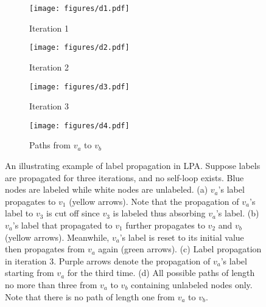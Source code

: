 \documentclass{article}
\begin{document}
		\begin{figure}[t]
		\centering
        \begin{subfigure}[b]{0.2\textwidth}
            \texttt{[image: figures/d1.pdf]}
            \caption{Iteration 1}
            \label{fig:d1}
        \end{subfigure}
        \hfill
        \begin{subfigure}[b]{0.2\textwidth}
            \texttt{[image: figures/d2.pdf]}
            \caption{Iteration 2}
            \label{fig:d2}
        \end{subfigure}
        \hfill
        \begin{subfigure}[b]{0.2\textwidth}
            \texttt{[image: figures/d3.pdf]}
            \caption{Iteration 3}
            \label{fig:d2}
        \end{subfigure}
        \hfill
        \begin{subfigure}[b]{0.2\textwidth}
            \texttt{[image: figures/d4.pdf]}
            \caption{Paths from $v_a$ to $v_b$}
            \label{fig:d2}
        \end{subfigure}
        \caption{An illustrating example of label propagation in LPA. Suppose labels are propagated for three iterations, and no self-loop exists. Blue nodes are labeled while white nodes are unlabeled. (a) $v_a$'s label propagates to $v_1$ (yellow arrows). Note that the propagation of $v_a$'s label to $v_3$ is cut off since $v_3$ is labeled thus absorbing $v_a$'s label. (b) $v_a$'s label that propagated to $v_1$ further propagates to $v_2$ and $v_b$ (yellow arrows). Meanwhile, $v_a$'s label is reset to its initial value then propagates from $v_a$ again (green arrows). (c) Label propagation in iteration 3. Purple arrows denote the propagation of $v_a$'s label starting from $v_a$ for the third time. (d) All possible paths of length no more than three from $v_a$ to $v_b$ containing unlabeled nodes only. Note that there is no path of length one from $v_a$ to $v_b$.}
        \label{fig:lemma_2}
    	\end{figure}
		
\end{document}
